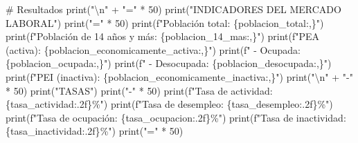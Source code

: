 \documentclass[
  doc,
  floatsintext,
  longtable,
  a4paper,
  nolmodern,
  notxfonts,
  notimes,
  12pt,
  colorlinks=true,linkcolor=blue,citecolor=blue,urlcolor=blue]{apa7}
\newenvironment{Shaded}{\begin{snugshade}}{\end{snugshade}}
\newcommand{\BuiltInTok}[1]{\textcolor[rgb]{0.00,0.23,0.31}{#1}}
\newcommand{\CharTok}[1]{\textcolor[rgb]{0.13,0.47,0.30}{#1}}
\newcommand{\CommentTok}[1]{\textcolor[rgb]{0.37,0.37,0.37}{#1}}
\newcommand{\DecValTok}[1]{\textcolor[rgb]{0.68,0.00,0.00}{#1}}
\newcommand{\NormalTok}[1]{\textcolor[rgb]{0.00,0.23,0.31}{#1}}
\newcommand{\OperatorTok}[1]{\textcolor[rgb]{0.37,0.37,0.37}{#1}}
\newcommand{\SpecialCharTok}[1]{\textcolor[rgb]{0.37,0.37,0.37}{#1}}
\newcommand{\SpecialStringTok}[1]{\textcolor[rgb]{0.13,0.47,0.30}{#1}}
\newcommand{\StringTok}[1]{\textcolor[rgb]{0.13,0.47,0.30}{#1}}
\begin{document}
\begin{Shaded}
\begin{Highlighting}[]
\CommentTok{\# Resultados}
\BuiltInTok{print}\NormalTok{(}\StringTok{"}\CharTok{\textbackslash{}n}\StringTok{"} \OperatorTok{+} \StringTok{"="} \OperatorTok{*} \DecValTok{50}\NormalTok{)}
\BuiltInTok{print}\NormalTok{(}\StringTok{"INDICADORES DEL MERCADO LABORAL"}\NormalTok{)}
\BuiltInTok{print}\NormalTok{(}\StringTok{"="} \OperatorTok{*} \DecValTok{50}\NormalTok{)}
\BuiltInTok{print}\NormalTok{(}\SpecialStringTok{f"Población total:              }\SpecialCharTok{\{}\NormalTok{poblacion\_total}\SpecialCharTok{:,\}}\SpecialStringTok{"}\NormalTok{)}
\BuiltInTok{print}\NormalTok{(}\SpecialStringTok{f"Población de 14 años y más:   }\SpecialCharTok{\{}\NormalTok{poblacion\_14\_mas}\SpecialCharTok{:,\}}\SpecialStringTok{"}\NormalTok{)}
\BuiltInTok{print}\NormalTok{(}\SpecialStringTok{f"PEA (activa):                 }\SpecialCharTok{\{}\NormalTok{poblacion\_economicamente\_activa}\SpecialCharTok{:,\}}\SpecialStringTok{"}\NormalTok{)}
\BuiltInTok{print}\NormalTok{(}\SpecialStringTok{f"  {-} Ocupada:                  }\SpecialCharTok{\{}\NormalTok{poblacion\_ocupada}\SpecialCharTok{:,\}}\SpecialStringTok{"}\NormalTok{)}
\BuiltInTok{print}\NormalTok{(}\SpecialStringTok{f"  {-} Desocupada:               }\SpecialCharTok{\{}\NormalTok{poblacion\_desocupada}\SpecialCharTok{:,\}}\SpecialStringTok{"}\NormalTok{)}
\BuiltInTok{print}\NormalTok{(}\SpecialStringTok{f"PEI (inactiva):               }\SpecialCharTok{\{}\NormalTok{poblacion\_economicamente\_inactiva}\SpecialCharTok{:,\}}\SpecialStringTok{"}\NormalTok{)}
\BuiltInTok{print}\NormalTok{(}\StringTok{"}\CharTok{\textbackslash{}n}\StringTok{"} \OperatorTok{+} \StringTok{"{-}"} \OperatorTok{*} \DecValTok{50}\NormalTok{)}
\BuiltInTok{print}\NormalTok{(}\StringTok{"TASAS"}\NormalTok{)}
\BuiltInTok{print}\NormalTok{(}\StringTok{"{-}"} \OperatorTok{*} \DecValTok{50}\NormalTok{)}
\BuiltInTok{print}\NormalTok{(}\SpecialStringTok{f"Tasa de actividad:            }\SpecialCharTok{\{}\NormalTok{tasa\_actividad}\SpecialCharTok{:.2f\}}\SpecialStringTok{\%"}\NormalTok{)}
\BuiltInTok{print}\NormalTok{(}\SpecialStringTok{f"Tasa de desempleo:            }\SpecialCharTok{\{}\NormalTok{tasa\_desempleo}\SpecialCharTok{:.2f\}}\SpecialStringTok{\%"}\NormalTok{)}
\BuiltInTok{print}\NormalTok{(}\SpecialStringTok{f"Tasa de ocupación:            }\SpecialCharTok{\{}\NormalTok{tasa\_ocupacion}\SpecialCharTok{:.2f\}}\SpecialStringTok{\%"}\NormalTok{)}
\BuiltInTok{print}\NormalTok{(}\SpecialStringTok{f"Tasa de inactividad:          }\SpecialCharTok{\{}\NormalTok{tasa\_inactividad}\SpecialCharTok{:.2f\}}\SpecialStringTok{\%"}\NormalTok{)}
\BuiltInTok{print}\NormalTok{(}\StringTok{"="} \OperatorTok{*} \DecValTok{50}\NormalTok{)}


\end{Highlighting}
\end{Shaded}
\end{document}
